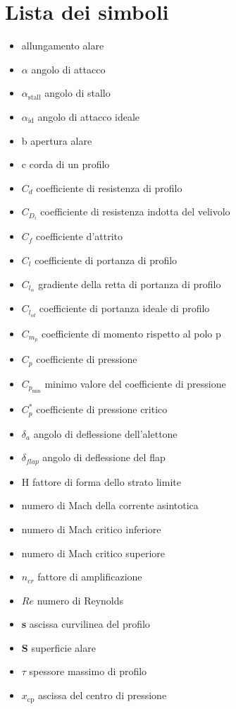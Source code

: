 \newpage
\thispagestyle{empty} 
\chapter{\normalsize Lista dei simboli}  %



\begin {itemize}
\item { \AR } allungamento alare
\item {\bfseries $\alpha$ } angolo di attacco
\item {\bfseries $\alpha_\mathrm{stall}$ }  angolo di stallo
\item {\bfseries $\alpha_\mathrm{id}$ } angolo di attacco ideale
\item { b } apertura alare
\item { c } corda di un profilo
\item {\bfseries $C_d$} coefficiente di resistenza di profilo
\item {\bfseries $C_{D_i}$} coefficiente di resistenza indotta del velivolo
\item {\bfseries $C_f$} coefficiente d'attrito
\item {\bfseries $C_l$} coefficiente di portanza di profilo
\item {\bfseries $C_{l_{\alpha}}$} gradiente della retta di portanza di profilo
\item {\bfseries $C_{l_{id}}$} coefficiente di portanza ideale di profilo
\item {\bfseries $C_{m_p}$} coefficiente di momento rispetto al polo p
\item {\bfseries $C_p$} coefficiente di pressione
\item {\bfseries $C_{p_\mathrm{min}}$} minimo valore del coefficiente di pressione
\item {\bfseries $C_p^*$} coefficiente di pressione critico
\item {\bfseries $\delta_a$} angolo di deflessione dell'alettone
\item {\bfseries $\delta_{flap}$} angolo di deflessione del flap
\item { H} fattore di forma dello strato limite
\item \Minf numero di Mach della corrente asintotica
\item \Mcrinf numero di Mach critico inferiore
\item \Msup numero di Mach critico superiore
\item {\bfseries $n_{cr}$} fattore di amplificazione
\item {$Re$} numero di Reynolds
\item {\bfseries s} ascissa curvilinea del profilo
\item {\bfseries S} superficie alare
\item {\bfseries $\tau$} spessore massimo di profilo
\item {\bfseries $x_\mathrm{cp}$} ascissa del centro di pressione
\end{itemize}